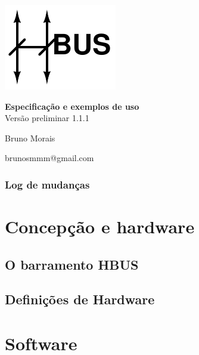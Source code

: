 \documentclass[11pt]{report}
\begin{document}
\newcommand{\hbus}[1]{\texttt{[image: ../media/hbus]}}
\newcommand{\hbuscommand}[1]{\textbf{#1}}

\newcommand{\HBUSDOCMASTER}{YES}

\begin{center}
\vspace*{\fill}
\includegraphics[scale=3]{../media/hbuslogo.pdf}

\huge \textbf{Especificação e exemplos de uso}\\
Versão preliminar 1.1.1
\vspace*{\fill}

Bruno Morais

brunosmmm@gmail.com

\end{center}

\pagebreak

\tableofcontents

\section{Log de mudanças}



\part{Concepção e hardware}

\chapter{O barramento HBUS}



\chapter{Definições de Hardware}



\part{Software}
\end{document}
